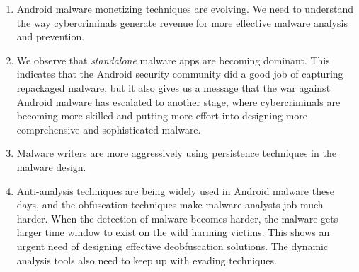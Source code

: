 \begin{enumerate}[leftmargin=0cm,itemindent=.5cm,labelwidth=\itemindent,labelsep=0cm,align=left]

\item Android malware monetizing techniques are evolving.
We need to understand the way cybercriminals generate revenue
for more effective malware analysis and prevention.

\item We observe that \emph{standalone} malware apps
are becoming dominant. This indicates that the Android security community
did a good job of capturing repackaged malware, but it also
gives us a message that the war against Android malware has escalated to another stage,
where cybercriminals are becoming more skilled and putting
more effort into designing more comprehensive and sophisticated malware.

\item Malware writers are more aggressively using persistence techniques in the malware design.

\item Anti-analysis techniques are being widely used in Android malware these days,
and the obfuscation techniques make malware analysts job much harder. %
When the detection of malware
becomes harder, the malware gets larger time window to exist on the wild harming victims.
This shows an urgent need of designing effective deobfuscation solutions. The 
dynamic analysis tools also need to keep up with evading techniques.

\end{enumerate}

